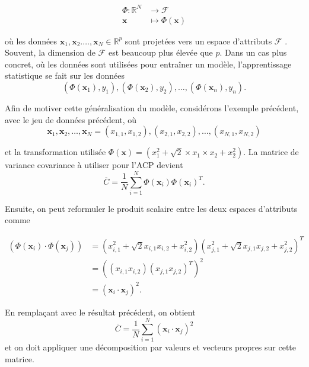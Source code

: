 \begin{align}\label{eq:featurespace}
\Phi : \mathbb{R}^N &\to \mathcal{F} \nonumber \\
\textbf{x} &\mapsto \Phi(\textbf{x}) 
\end{align}

où les données $\textbf{x}_1, \textbf{x}_2. \dots, \textbf{x}_N \in \mathbb{R}^p$ sont projetées vers un espace d'attributs $\mathcal{F}$ \cite{muller2001introduction}. Souvent, la dimension de $\mathcal{F}$ est beaucoup plus élevée que $p$. Dans un cas plus concret, où les données sont utilisées pour entraîner un modèle, l'apprentissage statistique se fait sur les données $$(\Phi(\textbf{x}_1), y_1), (\Phi(\textbf{x}_2), y_2), \dots, (\Phi(\textbf{x}_n), y_n).$$

Afin de motiver cette généralisation du modèle, considérons l'exemple précédent, avec le jeu de données précédent, où
$$\textbf{x}_1, \textbf{x}_2, \dots, \textbf{x}_N = (x_{1,1},x_{1,2}), (x_{2,1}, x_{2,2}), …, (x_{N,1}, x_{N,2})$$

et la transformation utilisée $\Phi(\textbf{x})= (x_1^2 + \sqrt{2} \times x_1\times x_2 + x_2^2)$. La matrice de variance covariance à utiliser pour l’ACP devient
$$\overline{C} = \frac{1}{N} \sum_{i = 1}^{N}   \Phi(\textbf{x}_i) \Phi(\textbf{x}_i)^{T}.$$

Ensuite, on peut reformuler le produit scalaire entre les deux espaces d'attributs comme

\begin{align*}
(\Phi(\textbf{x}_i) \cdot \Phi(\textbf{x}_j)) &= (x_{i, 1}^2 + \sqrt{2} x_{i, 1} x_{i, 2} + x_{i, 2}^2)(x_{j, 1}^2 + \sqrt{2} x_{j, 1} x_{j, 2} + x_{j, 2}^2)^T\\
&= ((x_{i, 1}x_{i, 2})(x_{j, 1}x_{j, 2})^T)^2\\
&= (\textbf{x}_i \cdot \textbf{x}_j)^2.
\end{align*}

En remplaçant avec le résultat précédent, on obtient
$$\overline{C} = \frac{1}{N} \sum_{i = 1}^{N} (\textbf{x}_i \cdot \textbf{x}_j)^2$$ et on doit appliquer une décomposition par valeurs et vecteurs propres sur cette matrice.